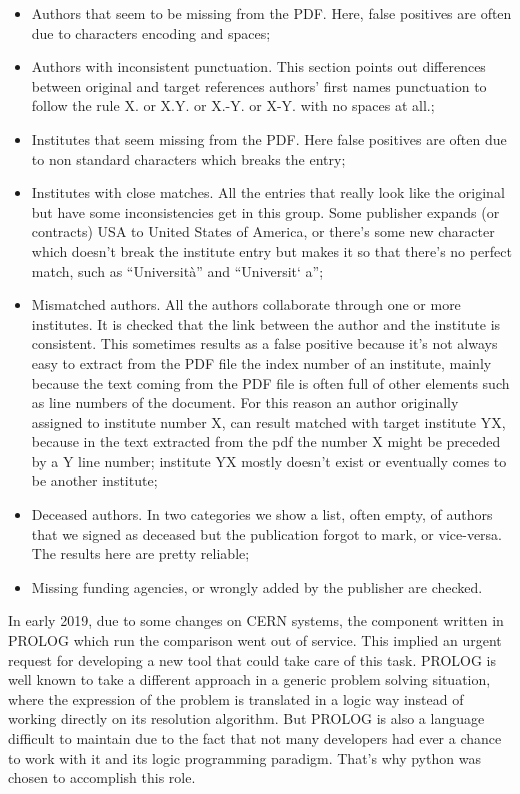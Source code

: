 \begin{itemize}
\item Authors that seem to be missing from the PDF. Here, false positives are often due to characters encoding and spaces;
\item Authors with inconsistent punctuation. This section points out differences between original and target references authors’ first names punctuation to follow the rule X. or X.Y. or X.-Y. or X-Y. with no spaces at all.;
\item Institutes that seem missing from the PDF. Here false positives are often due to non standard characters which breaks the entry;
\item Institutes with close matches. All the entries that really look like the original but have some inconsistencies get in this group. Some publisher expands (or contracts) USA to United States of America, or there’s some new character which doesn’t break the institute entry but makes it so that there’s no perfect match, such as \enquote{Università} and \enquote{Universit` a};
\item Mismatched authors. All the authors collaborate through one or more institutes.
  It is checked that the link between the author and the institute is consistent.
  This sometimes results as a false positive because it’s not always easy to extract from the PDF file the index number of an institute, mainly because the text coming from the PDF file is often full of other elements such as line numbers of the document.
  For this reason an author originally assigned to institute number X, can result matched with target institute YX, because in the text extracted from the pdf the number X might be preceded by a Y line number; institute YX mostly doesn’t exist or eventually comes to be another institute;
\item Deceased authors. In two categories we show a list, often empty, of authors that we signed as deceased but the publication forgot to mark, or vice-versa. The results here are pretty reliable;
\item Missing funding agencies, or wrongly added by the publisher are checked.
\end{itemize}

In early 2019, due to some changes on CERN systems, the component written in PROLOG which run the comparison went out of service. This implied an urgent request for developing a new tool that could take care of this task. PROLOG is well known to take a different approach in a generic problem solving situation, where the expression of the problem is translated in a logic way instead of working directly on its resolution algorithm. But PROLOG is also a language difficult to maintain due to the fact that not many developers had ever a chance to work with it and its logic programming paradigm. That’s why python was chosen to accomplish this role.

